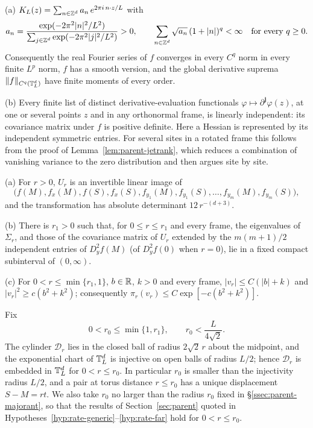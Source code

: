 \begin{lemma}\label{lem:rate-spectrum}
\textup{(a)} $K_L(z)=\sum_{n\in\mathbb Z^d}a_n\,e^{2\pi i\,n\cdot z/L}$ with
\begin{equation}\label{eq:rate-an}
a_n=\frac{\exp(-2\pi^2|n|^2/L^2)}{\sum_{j\in\mathbb Z^d}\exp(-2\pi^2|j|^2/L^2)}>0,\qquad \sum_{n\in\mathbb Z^d}\sqrt{a_n}\,(1+|n|)^q<\infty\quad\text{for every }q\ge0 .
\end{equation}
Consequently the real Fourier series of $f$ converges in every $C^q$ norm in every finite $L^p$ norm, $f$ has a smooth version, and the global derivative suprema $\|f\|_{C^q(\mathbb T^d_L)}$ have finite moments of every order.

\textup{(b)} Every finite list of distinct derivative-evaluation functionals $\varphi\mapsto\partial^{\mathbf j}\varphi(z)$, at one or several points $z$ and in any orthonormal frame, is linearly independent: its covariance matrix under $f$ is positive definite. Here a Hessian is represented by its independent symmetric entries. For several sites in a rotated frame this follows from the proof of Lemma~\ref{lem:parent-jetrank}, which reduces a combination of vanishing variance to the zero distribution and then argues site by site.
\end{lemma}

\begin{lemma}\label{lem:rate-frame}
\textup{(a)} For $r>0$, $U_r$ is an invertible linear image of
\[
\bigl(f(M),f_x(M),f(S),f_x(S),f_{y_1}(M),f_{y_1}(S),\dots,f_{y_m}(M),f_{y_m}(S)\bigr),
\]
and the transformation has absolute determinant $12\,r^{-(d+3)}$.

\textup{(b)} There is $r_1>0$ such that, for $0\le r\le r_1$ and every frame, the eigenvalues of $\Sigma_r$, and those of the covariance matrix of $U_r$ extended by the $m(m+1)/2$ independent entries of $D_y^2f(M)$ \textup{(}of $D_y^2f(0)$ when $r=0$\textup{)}, lie in a fixed compact subinterval of $(0,\infty)$.

\textup{(c)} For $0<r\le\min\{r_1,1\}$, $b\in\mathbb R$, $k>0$ and every frame, $|v_r|\le C(|b|+k)$ and $|v_r|^2\ge c(b^2+k^2)$; consequently $\pi_r(v_r)\le C\exp[-c(b^2+k^2)]$.
\end{lemma}

Fix
\begin{equation}\label{eq:rate-r0}
0<r_0\le\min\{1,r_1\},\qquad r_0<\frac L{4\sqrt2} .
\end{equation}
The cylinder $\mathcal D_r$ lies in the closed ball of radius $2\sqrt2\,r$ about the midpoint, and the exponential chart of $\mathbb T^d_L$ is injective on open balls of radius $L/2$; hence $\mathcal D_r$ is embedded in $\mathbb T^d_L$ for $0<r\le r_0$. In particular $r_0$ is smaller than the injectivity radius $L/2$, and a pair at torus distance $r\le r_0$ has a unique displacement $S-M=rt$. We also take $r_0$ no larger than the radius $r_0$ fixed in \S\ref{ssec:parent-majorant}, so that the results of Section~\ref{sec:parent} quoted in Hypotheses~\ref{hyp:rate-generic}--\ref{hyp:rate-far} hold for $0<r\le r_0$.

